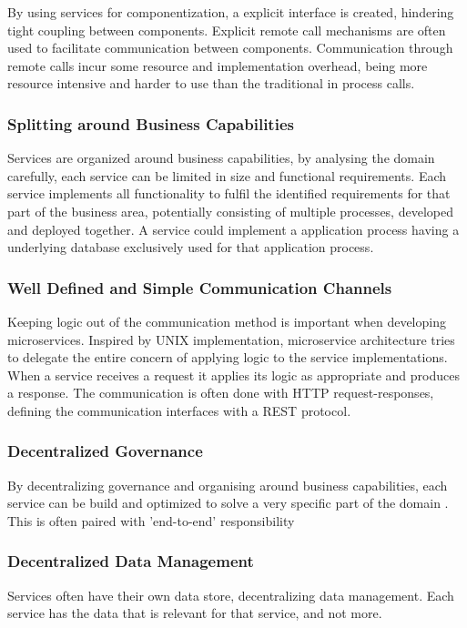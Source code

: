 By using services for componentization, a explicit interface is created, hindering tight coupling between components. Explicit remote call mechanisms are often used to facilitate communication between components. Communication through remote calls incur some resource and implementation overhead, being more resource intensive and harder to use than the traditional in process calls.

\subsubsection*{Splitting around Business Capabilities}
Services are organized around business capabilities, by analysing the domain carefully, each service can be limited in size and functional requirements. Each service implements all functionality to fulfil the identified requirements for that part of the business area, potentially consisting of multiple processes, developed and deployed together. A service could implement a application process having a underlying database exclusively used for that application process\cite{fowler2014microservices}.

\subsubsection*{Well Defined and Simple Communication Channels}
Keeping logic out of the communication method is important when developing microservices. Inspired by UNIX implementation, microservice architecture tries to delegate the entire concern of applying logic to the service implementations. When a service receives a request it applies its logic as appropriate and produces a response. The communication is often done with HTTP request-responses, defining the communication interfaces with a REST protocol\cite{fowler2014microservices}.

\subsubsection*{Decentralized Governance}
By decentralizing governance and organising around business capabilities, each service can be build and optimized to solve a very specific part of the domain \cite{fowler2014microservices}.
This is often paired with 'end-to-end' responsibility 

\subsubsection*{Decentralized Data Management}
Services often have their own data store, decentralizing data management. Each service has the data that is relevant for that service, and not more. 

